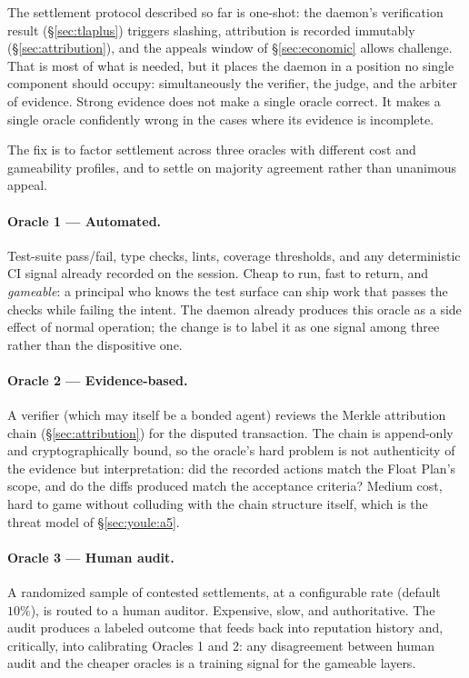 \documentclass[11pt,a4paper]{article}
\theoremstyle{definition}
\theoremstyle{remark}
\begin{document}
The settlement protocol described so far is one-shot: the daemon's verification result (\S\ref{sec:tlaplus}) triggers slashing, attribution is recorded immutably (\S\ref{sec:attribution}), and the appeals window of \S\ref{sec:economic} allows challenge. That is most of what is needed, but it places the daemon in a position no single component should occupy: simultaneously the verifier, the judge, and the arbiter of evidence. Strong evidence does not make a single oracle correct. It makes a single oracle confidently wrong in the cases where its evidence is incomplete.

The fix is to factor settlement across three oracles with different cost and gameability profiles, and to settle on majority agreement rather than unanimous appeal.

\paragraph{Oracle 1 --- Automated.}
Test-suite pass/fail, type checks, lints, coverage thresholds, and any deterministic CI signal already recorded on the session. Cheap to run, fast to return, and \emph{gameable}: a principal who knows the test surface can ship work that passes the checks while failing the intent. The daemon already produces this oracle as a side effect of normal operation; the change is to label it as one signal among three rather than the dispositive one.

\paragraph{Oracle 2 --- Evidence-based.}
A verifier (which may itself be a bonded agent) reviews the Merkle attribution chain (\S\ref{sec:attribution}) for the disputed transaction. The chain is append-only and cryptographically bound, so the oracle's hard problem is not authenticity of the evidence but interpretation: did the recorded actions match the Float Plan's scope, and do the diffs produced match the acceptance criteria? Medium cost, hard to game without colluding with the chain structure itself, which is the threat model of \S\ref{sec:youle:a5}.

\paragraph{Oracle 3 --- Human audit.}
A randomized sample of contested settlements, at a configurable rate (default $10\%$), is routed to a human auditor. Expensive, slow, and authoritative. The audit produces a labeled outcome that feeds back into reputation history and, critically, into calibrating Oracles 1 and 2: any disagreement between human audit and the cheaper oracles is a training signal for the gameable layers.
\end{document}
